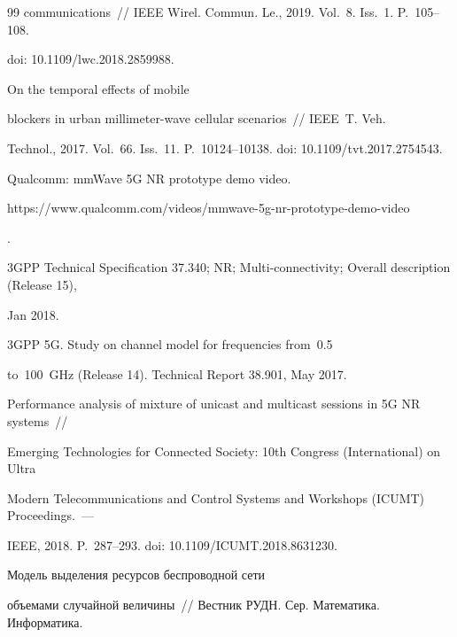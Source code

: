 {{\begin{thebibliography}{99}
communications~/\!\!/ IEEE Wirel. Commun. Le., 2019. Vol.~8. Iss.~1. P.~105--108. 


doi: 10.1109\!/\!lwc.2018.2859988.




 On the temporal effects of mobile 


blockers in urban millimeter-wave cellular scenarios~/\!\!/ IEEE~T. Veh. 


Technol., 2017. Vol.~66. Iss.~11. P.~10124--10138. doi: 10.1109\!/\!tvt.2017.2754543.




Qualcomm: mmWave 5G NR prototype demo video. {\sf  


https://www.qualcomm.com/\linebreak videos/mmwave-5g-nr-prototype-demo-video}.




3GPP Technical Specification 37.340; NR; Multi-connectivity; Overall description (Release 15), 


Jan 2018.




3GPP 5G. Study on channel model for frequencies from~0.5 


to~100~GHz (Release 14).  Technical Report 38.901, May 2017.






Performance analysis of mixture of unicast and multicast sessions in 5G NR systems~/\!\!/ 


Emerging Technologies for Connected Society: 10th Congress (International) on Ultra 


Modern Telecommunications and Control Systems and Workshops (ICUMT) Proceedings.~--- 


IEEE, 2018. P.~287--293. doi: 10.1109\!/\linebreak ICUMT.2018.8631230.




 Модель выделения ресурсов беспроводной сети 


объемами случайной величины~/\!\!/ Вестник РУДН. Сер. Математика. Информатика. 



\end{thebibliography}}}
